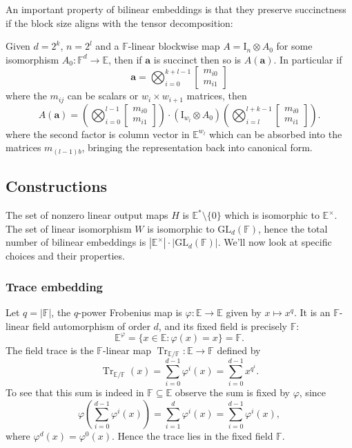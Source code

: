 \documentclass[11pt,letterpaper,usenames,dvipsnames]{article}
\begin{document}
An important property of bilinear embeddings is that they preserve succinctness if the block size aligns with the tensor decomposition:

\begin{theorem}\label{suc-embed}
Given $d = 2^k$, $n = 2^l$ and a $\mathbb{F}$-linear blockwise map $A = \mathrm{I}_n \otimes A_0$ for some isomorphism $A_0 : \mathbb{F}^d \to \mathbb{E}$, then if $\mathbf{a}$  is succinct then so is $A(\mathbf{a})$. In particular if
\[
\mathbf{a} = \bigotimes_{i=0}^{k+l-1} 
\begin{bmatrix}
m_{i0} \\ m_{i1}
\end{bmatrix}
\]
where the $m_{ij}$ can be scalars or $w_i \times w_{i+1}$ matrices, then
\[
A(\mathbf{a}) = 
\left(
\bigotimes_{i=0}^{l-1} 
\begin{bmatrix}
m_{i0} \\ m_{i1}
\end{bmatrix}
\right) \cdot
(\mathrm{I}_{w_l} \otimes A_0)\left(
\bigotimes_{i=l}^{l+k-1} 
\begin{bmatrix}
m_{i0} \\ m_{i1}
\end{bmatrix}
\right)\text{.}
\]
where the second factor is column vector in $\mathbb{E}^{w_l}$ which can be absorbed into the matrices $m_{(l-1)b}$, bringing the representation back into canonical form.
\end{theorem}

\subsection{Constructions}

The set of nonzero linear output maps $H$ is $\mathbb{E}^* \setminus \{0\}$ which is isomorphic to $\mathbb{E}^\times$. The set of linear isomorphism $W$ is isomorphic to $\mathrm{GL}_d(\mathbb{F})$, hence the total number of bilinear embeddings is $|\mathbb{E}^\times| \cdot |\mathrm{GL}_d(\mathbb{F})|$. We'll now look at specific choices and their properties.

\subsubsection{Trace embedding}

Let $q = |\mathbb F|$, the $q$-power Frobenius map is $\varphi:\mathbb E\to\mathbb E$ given by $x\mapsto x^q$. It is an $\mathbb F$-linear field automorphism of order $d$, and its
fixed field is precisely $\mathbb F$:
\[
\mathbb E^\varphi
= \{x\in\mathbb E:\varphi(x)=x\}
= \mathbb F.
\]
The field trace is the $\mathbb F$-linear map $\operatorname{Tr}_{\mathbb E/\mathbb F}:\mathbb E\to\mathbb F$ defined by
\[
\operatorname{Tr}_{\mathbb E/\mathbb F}(x)
= \sum_{i=0}^{d-1}\varphi^i(x)
= \sum_{i=0}^{d-1}x^{q^i}.
\]
To see that this sum is indeed in $\mathbb{F} \subseteq \mathbb{E}$ observe the sum is fixed by $\varphi$, since
\[
\varphi\left( \sum_{i=0}^{d-1}\varphi^i(x) \right)
= \sum_{i=1}^{d}\varphi^i(x)
= \sum_{i=0}^{d-1}\varphi^i(x),
\]
where $\varphi^d(x)=\varphi^0(x)$. Hence the trace lies in the fixed field $\mathbb F$.
\end{document}
